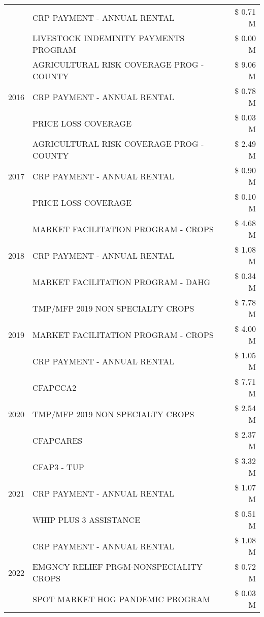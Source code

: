\begin{tabular}{llr}
 & CRP PAYMENT - ANNUAL RENTAL & \$ 0.71 M \\
 & LIVESTOCK INDEMINITY PAYMENTS PROGRAM & \$ 0.00 M \\
\cline{1-3}
\multirow[t]{3}{*}{2016} & AGRICULTURAL RISK COVERAGE PROG - COUNTY & \$ 9.06 M \\
 & CRP PAYMENT - ANNUAL RENTAL & \$ 0.78 M \\
 & PRICE LOSS COVERAGE & \$ 0.03 M \\
\cline{1-3}
\multirow[t]{3}{*}{2017} & AGRICULTURAL RISK COVERAGE PROG - COUNTY & \$ 2.49 M \\
 & CRP PAYMENT - ANNUAL RENTAL & \$ 0.90 M \\
 & PRICE LOSS COVERAGE & \$ 0.10 M \\
\cline{1-3}
\multirow[t]{3}{*}{2018} & MARKET FACILITATION PROGRAM - CROPS & \$ 4.68 M \\
 & CRP PAYMENT - ANNUAL RENTAL & \$ 1.08 M \\
 & MARKET FACILITATION PROGRAM - DAHG & \$ 0.34 M \\
\cline{1-3}
\multirow[t]{3}{*}{2019} & TMP/MFP 2019 NON SPECIALTY CROPS & \$ 7.78 M \\
 & MARKET FACILITATION PROGRAM - CROPS & \$ 4.00 M \\
 & CRP PAYMENT - ANNUAL RENTAL & \$ 1.05 M \\
\cline{1-3}
\multirow[t]{3}{*}{2020} & CFAPCCA2 & \$ 7.71 M \\
 & TMP/MFP 2019 NON SPECIALTY CROPS & \$ 2.54 M \\
 & CFAPCARES & \$ 2.37 M \\
\cline{1-3}
\multirow[t]{3}{*}{2021} & CFAP3 - TUP & \$ 3.32 M \\
 & CRP PAYMENT - ANNUAL RENTAL & \$ 1.07 M \\
 & WHIP PLUS 3 ASSISTANCE & \$ 0.51 M \\
\cline{1-3}
\multirow[t]{3}{*}{2022} & CRP PAYMENT - ANNUAL RENTAL & \$ 1.08 M \\
 & EMGNCY RELIEF PRGM-NONSPECIALITY CROPS & \$ 0.72 M \\
 & SPOT MARKET HOG PANDEMIC PROGRAM & \$ 0.03 M \\
\cline{1-3}
\bottomrule
\end{tabular}

